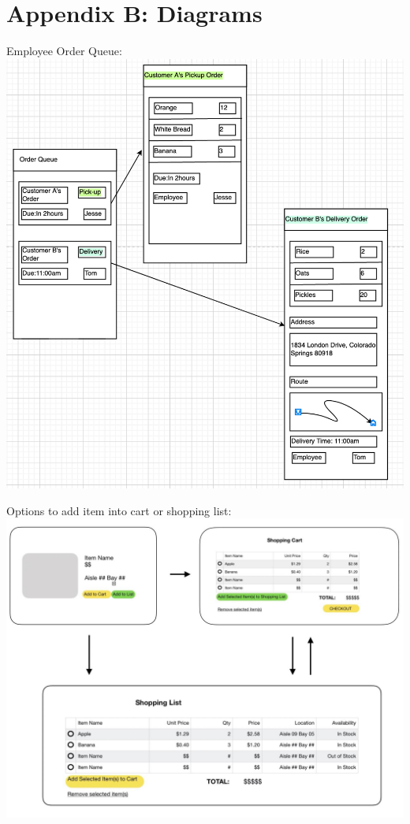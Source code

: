 \documentclass{scrreprt}
\theoremstyle{funreq}
\begin{document}
	\section{Appendix B: Diagrams}
	Employee Order Queue:\\
	\includegraphics[width=6 in]{3.png}
	
	Options to add item into cart or shopping list:\\
	\includegraphics[width=6 in]{4.jpg}
	
	
\end{document}
